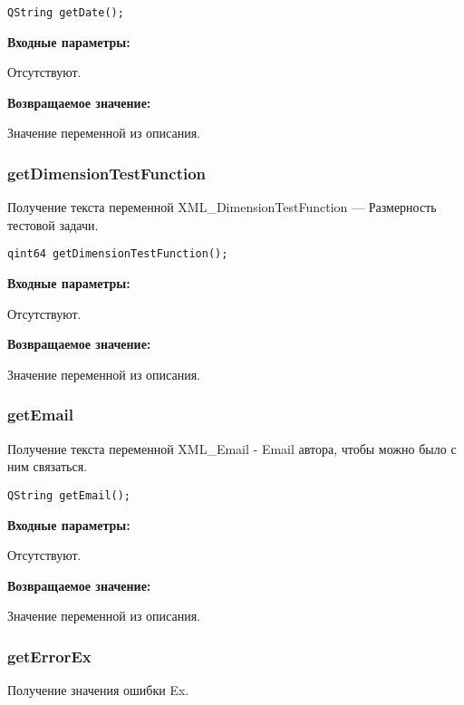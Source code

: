 \documentclass[a4paper,12pt]{article}
\begin{document}
\begin{lstlisting}[label=code_syntax_getDate,caption=Синтаксис]
QString getDate();
\end{lstlisting}

\textbf{Входные параметры:}

Отсутствуют.

\textbf{Возвращаемое значение:}

Значение переменной из описания.


\subsubsection{getDimensionTestFunction}\label{getDimensionTestFunction}

Получение текста переменной  XML\_DimensionTestFunction --- Размерность тестовой задачи.


\begin{lstlisting}[label=code_syntax_getDimensionTestFunction,caption=Синтаксис]
qint64 getDimensionTestFunction();
\end{lstlisting}

\textbf{Входные параметры:}

Отсутствуют.

\textbf{Возвращаемое значение:}

Значение переменной из описания.


\subsubsection{getEmail}\label{getEmail}

Получение текста переменной  XML\_Email - Email автора, чтобы можно было с ним связаться.


\begin{lstlisting}[label=code_syntax_getEmail,caption=Синтаксис]
QString getEmail();
\end{lstlisting}

\textbf{Входные параметры:}

Отсутствуют.

\textbf{Возвращаемое значение:}

Значение переменной из описания.


\subsubsection{getErrorEx}\label{getErrorEx}

Получение значения ошибки Ex.
\end{document}
